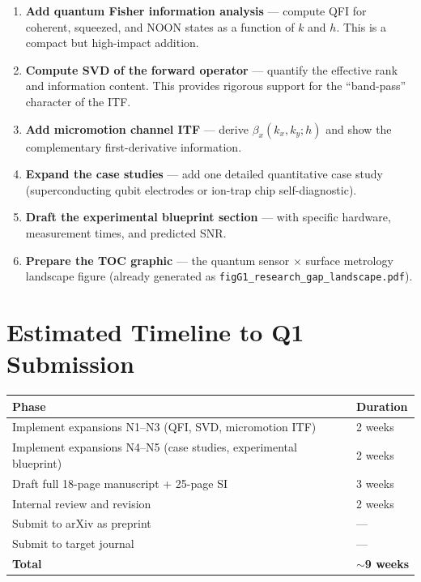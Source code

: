 \documentclass[11pt,a4paper]{article}
\begin{document}
\begin{enumerate}[label=\textbf{N\arabic*}, leftmargin=*]
    \item \textbf{Add quantum Fisher information analysis} --- compute QFI for coherent, squeezed, and NOON states as a function of $k$ and $h$. This is a compact but high-impact addition.
    \item \textbf{Compute SVD of the forward operator} --- quantify the effective rank and information content. This provides rigorous support for the ``band-pass'' character of the ITF.
    \item \textbf{Add micromotion channel ITF} --- derive $\beta_x(k_x,k_y;h)$ and show the complementary first-derivative information.
    \item \textbf{Expand the case studies} --- add one detailed quantitative case study (superconducting qubit electrodes or ion-trap chip self-diagnostic).
    \item \textbf{Draft the experimental blueprint section} --- with specific hardware, measurement times, and predicted SNR.
    \item \textbf{Prepare the TOC graphic} --- the quantum sensor $\times$ surface metrology landscape figure (already generated as \texttt{figG1\_research\_gap\_landscape.pdf}).
\end{enumerate}

\section{Estimated Timeline to Q1 Submission}

\begin{center}
\begin{tabular}{@{}ll@{}}
\toprule
Phase & Duration \\
\midrule
Implement expansions N1--N3 (QFI, SVD, micromotion ITF) & 2 weeks \\
Implement expansions N4--N5 (case studies, experimental blueprint) & 2 weeks \\
Draft full 18-page manuscript + 25-page SI & 3 weeks \\
Internal review and revision & 2 weeks \\
Submit to arXiv as preprint & --- \\
Submit to target journal & --- \\
\hline
\textbf{Total} & \textbf{$\sim$9 weeks} \\
\bottomrule
\end{tabular}
\end{center}
\end{document}
